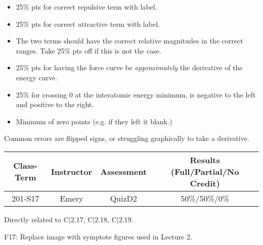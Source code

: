 \begin{rubric}

\begin{itemize}
	\item 25\% pts for correct repulsive term with label.
	\item 25\% pts for correct attractive term with label. 
	\item The two terms should have the correct relative magnitudes in the correct ranges. Take 25\% pts off if this is not the case.
	\item 25\% pts for having the force curve be \emph{approximately} the derivative of the energy curve. 
	\item 25\% for crossing 0 at the interatomic energy minimum, is negative to the left and positive to the right.
	\item Minimum of zero points (e.g. if they left it blank.)
\end{itemize}

\end{rubric}

\begin{outcomes}
Common errors are flipped signs, or struggling graphically to take a derivative.
	\begin{center}
		\begin{tabular}{cccc}
			\hline\hline
                Class-Term & Instructor & Assessment & Results (Full/Partial/No Credit) \\
			\hline
                201-S17 & Emery & QuizD2 & 50\%/50\%/0\%\\
			\hline
		\end{tabular}
	\end{center}
\end{outcomes}

\begin{comments}

Directly related to C$|$2.17, C$|$2.18, C$|$2.19.

F17: Replace image with symptote figures used in Lecture 2.

\end{comments}
